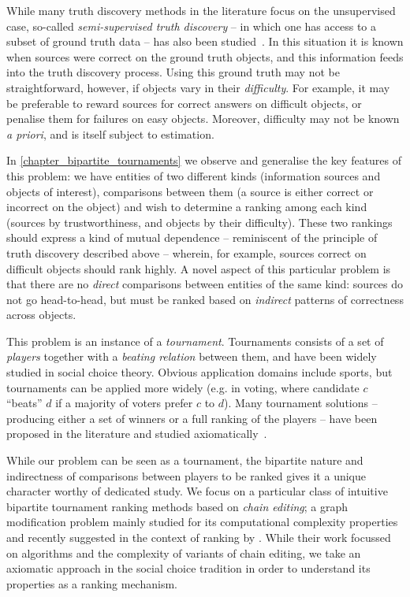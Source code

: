 While many truth discovery methods in the literature focus on the unsupervised
case, so-called \emph{semi-supervised truth discovery} -- in which one has
access to a subset of ground truth data -- has also been
studied~\cite{yin_supervised_2011,rekatsinas2017slimfast}. In this situation it
is known when sources were correct on the ground truth objects, and this
information feeds into the truth discovery process. Using this ground truth may
not be straightforward, however, if objects vary in their \emph{difficulty}.
For example, it may be preferable to reward sources for correct answers on
difficult objects, or penalise them for failures on easy objects. Moreover,
difficulty may not be known \emph{a priori}, and is itself subject to
estimation.

In \cref{chapter_bipartite_tournaments} we observe and generalise the key
features of this problem: we have entities of two different kinds (information
sources and objects of interest), comparisons between them (a source is either
correct or incorrect on the object) and wish to determine a ranking among each
kind (sources by trustworthiness, and objects by their difficulty). These two
rankings should express a kind of mutual dependence -- reminiscent of the
principle of truth discovery described above -- wherein, for example, sources
correct on difficult objects should rank highly. A novel aspect of this
particular problem is that there are no \emph{direct} comparisons between
entities of the same kind: sources do not go head-to-head, but must be ranked
based on \emph{indirect} patterns of correctness across objects.

This problem is an instance of a \emph{tournament}. Tournaments consists of a
set of \emph{players} together with a \emph{beating relation} between them, and
have been widely studied in social choice theory. Obvious application domains
include sports, but tournaments can be applied more widely (e.g. in voting,
where candidate $c$ ``beats'' $d$ if a majority of voters prefer $c$ to $d$).
Many tournament solutions -- producing either a set of winners or a full
ranking of the players -- have been proposed in the literature and studied
axiomatically~\cite{gonzalez2014paired,brandt2016a}.

While our problem can be seen as a tournament, the bipartite nature and
indirectness of comparisons between players to be ranked gives it a unique
character worthy of dedicated study. We focus on a particular class of
intuitive bipartite tournament ranking methods based on \emph{chain editing}; a
graph modification problem mainly studied for its computational complexity
properties~\cite{yannakakis1981computing} and recently suggested in the context
of ranking by \textcite{jiao2017algorithms}. While their work focussed on
algorithms and the complexity of variants of chain editing, we take an
axiomatic approach in the social choice tradition in order to understand its
properties as a ranking mechanism.

